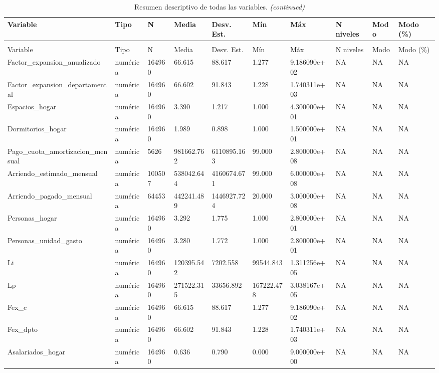 
\begin{longtable}[t]{llllllllll}
\caption{\label{tab:tab:resumen_todas}Resumen descriptivo de todas las variables.}\\
\toprule
Variable & Tipo & N & Media & Desv. Est. & Mín & Máx & N niveles & Modo & Modo (\%)\\
\midrule
\endfirsthead
\caption[]{Resumen descriptivo de todas las variables. \textit{(continued)}}\\
\toprule
Variable & Tipo & N & Media & Desv. Est. & Mín & Máx & N niveles & Modo & Modo (\%)\\
\midrule
\endhead

\endfoot
\bottomrule
\endlastfoot
Factor\_expansion\_anualizado & numérica & 164960 & 66.615 & 88.617 & 1.277 & 9.186090e+02 & NA & NA & NA\\
Factor\_expansion\_departamental & numérica & 164960 & 66.602 & 91.843 & 1.228 & 1.740311e+03 & NA & NA & NA\\
Espacios\_hogar & numérica & 164960 & 3.390 & 1.217 & 1.000 & 4.300000e+01 & NA & NA & NA\\
Dormitorios\_hogar & numérica & 164960 & 1.989 & 0.898 & 1.000 & 1.500000e+01 & NA & NA & NA\\
Pago\_cuota\_amortizacion\_mensual & numérica & 5626 & 981662.762 & 6110895.163 & 99.000 & 2.800000e+08 & NA & NA & NA\\
Arriendo\_estimado\_mensual & numérica & 100507 & 538042.644 & 4160674.671 & 99.000 & 6.000000e+08 & NA & NA & NA\\
Arriendo\_pagado\_mensual & numérica & 64453 & 442241.489 & 1446927.724 & 20.000 & 3.000000e+08 & NA & NA & NA\\
Personas\_hogar & numérica & 164960 & 3.292 & 1.775 & 1.000 & 2.800000e+01 & NA & NA & NA\\
Personas\_unidad\_gasto & numérica & 164960 & 3.280 & 1.772 & 1.000 & 2.800000e+01 & NA & NA & NA\\
Li & numérica & 164960 & 120395.542 & 7202.558 & 99544.843 & 1.311256e+05 & NA & NA & NA\\
Lp & numérica & 164960 & 271522.315 & 33656.892 & 167222.478 & 3.038167e+05 & NA & NA & NA\\
Fex\_c & numérica & 164960 & 66.615 & 88.617 & 1.277 & 9.186090e+02 & NA & NA & NA\\
Fex\_dpto & numérica & 164960 & 66.602 & 91.843 & 1.228 & 1.740311e+03 & NA & NA & NA\\
Asalariados\_hogar & numérica & 164960 & 0.636 & 0.790 & 0.000 & 9.000000e+00 & NA & NA & NA\\

\end{longtable}
